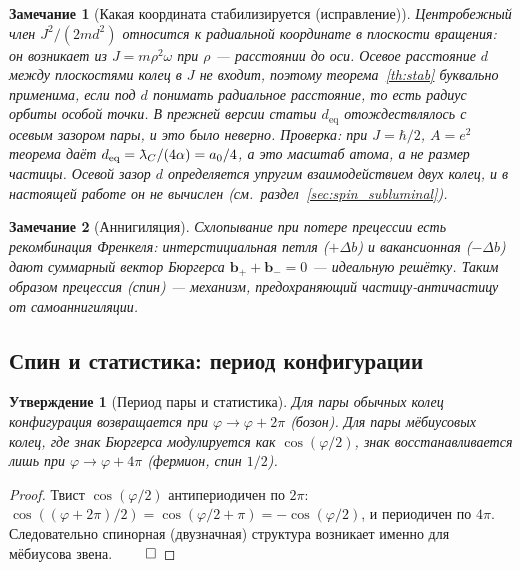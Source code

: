 \documentclass[12pt,a4paper]{article}
\newtheorem{proposition}{Утверждение}
\newtheorem{remark}{Замечание}
\providecommand{\lambdabar}{{\mkern0.75mu\mathchar'26\mkern-9.75mu\lambda}}
\begin{document}
\begin{remark}[Какая координата стабилизируется (исправление)]
\label{rem:stab_axis}
Центробежный член $J^2/(2md^2)$ относится к \emph{радиальной} координате в
плоскости вращения: он возникает из $J=m\rho^2\omega$ при $\rho$ --- расстоянии
до оси. Осевое расстояние $d$ между плоскостями колец в $J$ не входит, поэтому
теорема~\ref{th:stab} буквально применима, если под $d$ понимать радиальное
расстояние, то есть радиус орбиты особой точки. В прежней версии статьи $d_{\text{eq}}$
отождествлялось с осевым зазором пары, и это было неверно. Проверка: при $J=\hbar/2$,
$A=e^2$ теорема даёт $d_{\text{eq}}=\lambdabar_C/(4\alpha)=a_0/4$, а это
масштаб атома, а не размер частицы. Осевой зазор $d$ определяется упругим
взаимодействием двух колец, и в настоящей работе он не вычислен
(см.\ раздел~\ref{sec:spin_subluminal}).
\end{remark}

\begin{remark}[Аннигиляция]
Схлопывание при потере прецессии есть рекомбинация Френкеля: интерстициальная
петля ($+\Delta b$) и вакансионная ($-\Delta b$) дают суммарный вектор Бюргерса
$\mathbf{b}_++\mathbf{b}_-=0$ --- идеальную решётку. Таким образом прецессия
(спин) --- механизм, предохраняющий частицу-античастицу от самоаннигиляции.
\end{remark}

\subsection{Спин и статистика: период конфигурации}
\begin{proposition}[Период пары и статистика]
Для пары обычных колец конфигурация возвращается при $\varphi\to\varphi+2\pi$
(бозон). Для пары мёбиусовых колец, где знак Бюргерса модулируется как
$\cos(\varphi/2)$, знак восстанавливается лишь при $\varphi\to\varphi+4\pi$
(фермион, спин $1/2$).
\end{proposition}
\begin{proof}
Твист $\cos(\varphi/2)$ антипериодичен по $2\pi$:
$\cos((\varphi+2\pi)/2)=\cos(\varphi/2+\pi)=-\cos(\varphi/2)$, и периодичен по
$4\pi$. Следовательно спинорная (двузначная) структура возникает именно для
мёбиусова звена. $\qed$
\end{proof}
\end{document}
